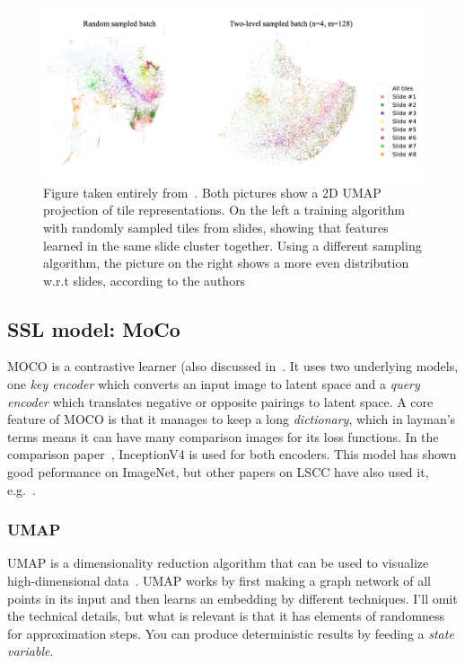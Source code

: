 \documentclass[10pt,twocolumn,letterpaper]{article}
\begin{document}
\begin{figure}
  \includegraphics[scale=.17]{./umap.png}
  \caption{Figure taken entirely from~\cite{sslUMAP}. Both pictures show a 2D \gls{UMAP} projection of tile representations. On the left a training algorithm with randomly sampled tiles from slides, showing that features learned in the same slide cluster together. Using a different sampling algorithm, the picture on the right shows a more even distribution w.r.t slides, according to the authors}
  \label{fig:umap}
\end{figure}


\subsection{\gls{SSL} model: MoCo}\label{subsec:moco}
\gls{MOCO}\cite{moco} is a contrastive learner (also discussed in~. It uses two underlying models, one \textit{key encoder} which converts an input image to latent space and a \textit{query encoder} which translates negative or opposite pairings to latent space. A core feature of \gls{MOCO} is that it manages to keep a long \textit{dictionary}, which in layman's terms means it can have many comparison images for its loss functions. In the comparison paper~\cite{sslUMAP}, InceptionV4\cite{inceptionV4} is used for both encoders. This model has shown good peformance on ImageNet, but other papers on \gls{LSCC} have also used it, e.g.~\cite{otherInception}.

\subsubsection{UMAP}\label{subsubsec:umap}
\gls{UMAP} is a dimensionality reduction algorithm that can be used to visualize high-dimensional data~\cite{umap}. \gls{UMAP} works by first making a graph network of all points in its input and then learns an embedding by different techniques. I'll omit the technical details, but what is relevant is that it has elements of randomness for approximation steps. You can produce deterministic results by feeding a \textit{state variable}.
\end{document}
